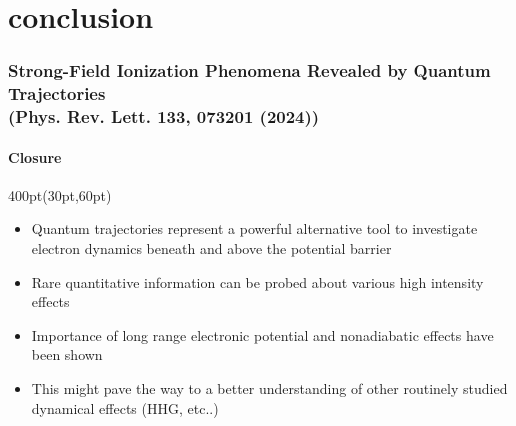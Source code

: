 
\section{conclusion}

\begin{frame}
\frametitle{Strong-Field Ionization Phenomena Revealed by Quantum Trajectories \\
\small (Phys. Rev. Lett. \textbf{133}, 073201 (2024))}

\framesubtitle{Closure}

\small
\begin{textblock*}{400pt}(30pt,60pt)
\begin{itemize}
\footnotesize
\item Quantum trajectories represent a powerful alternative tool
to investigate electron dynamics beneath and above the potential barrier 
\item Rare quantitative information can be probed about 
various high intensity effects
\item Importance of long range electronic potential and nonadiabatic effects 
have been shown

\vspace{20pt}

\item This might pave the way to a  better understanding of 
other routinely studied dynamical effects (HHG, etc..)
\end{itemize}

\end{textblock*}



\end{frame}
